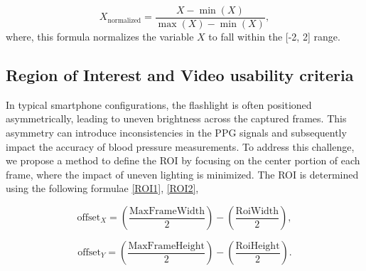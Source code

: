 \documentclass[journal,twoside,web]{ieeecolor}
\begin{document}
\begin{equation}
\label{min-max}
    X_{\text{normalized}} = \frac{X - \min(X)}{\max(X) - \min(X)},
\end{equation}
where, this formula normalizes the variable \(X\) to fall within the [-2, 2] range.
\subsection{Region of Interest and Video usability criteria}
In typical smartphone configurations, the flashlight is often positioned asymmetrically, leading to uneven brightness across the captured frames. This asymmetry can introduce inconsistencies in the PPG signals and subsequently impact the accuracy of blood pressure measurements. To address this challenge, we propose a method to define the ROI by focusing on the center portion of each frame, where the impact of uneven lighting is minimized. The ROI is determined using the following formulae \ref{ROI1}, \ref{ROI2},

\begin{equation}
\label{ROI1}
\text{offset}_{X} = \left( \frac{\text{MaxFrameWidth}}{2} \right) - \left( \frac{\text{RoiWidth}}{2} \right),
\end{equation}


\begin{equation}
\label{ROI2}
\text{offset}_{Y} = \left( \frac{\text{MaxFrameHeight}}{2} \right) - \left( \frac{\text{RoiHeight}}{2} \right).
\end{equation}
\end{document}
